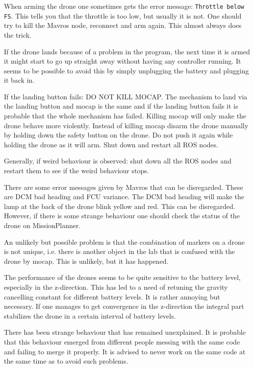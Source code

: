 \documentclass[titlepage,11pt,a4paper]{article}
\begin{document}
When arming the drone one sometimes gets the error message:
\texttt{Throttle below FS}. This tells you that the throttle is too
low, but usually it is not. One should try to kill the Mavros node,
reconnect and arm again. This almost always does the trick.

If the drone lands because of a problem in the program, the next time
it is armed it might start to go up straight away without having any
controller running. It seems to be possible to avoid this by simply
unplugging the battery and plugging it back in.

If the landing button fails: DO NOT KILL MOCAP. The mechanism to land
via the landing button and mocap is the same and if the landing button
fails it is probable that the whole mechanism has failed. Killing
mocap will only make the drone behave more violently. Instead of
killing mocap disarm the drone manually by holding down the safety
button on the drone. Do not push it again while holding the drone as
it will arm. Shut down and restart all ROS nodes.

Generally, if weird behaviour is observed: shut down all the ROS nodes
and restart them to see if the weird behaviour stops.

There are some error messages given by Mavros that can be
disregarded. These are DCM bad heading and FCU variance. The DCM bad
heading will make the lamp at the back of the drone blink yellow and
red. This can be disregarded. However, if there is some strange
behaviour one should check the status of the drone on MissionPlanner.

An unlikely but possible problem is that the combination of markers on
a drone is not unique, i.e. there is another object in the lab that is
confused with the drone by mocap. This is unlikely, but it has
happened.

The performance of the drones seems to be quite sensitive to the
battery level, especially in the z-direction. This has led to a need
of retuning the gravity cancelling constant for different battery
levels. It is rather annoying but necessary. If one manages to get
convergence in the z-direction the integral part stabilizes the drone
in a certain interval of battery levels.

There has been strange behaviour that has remained unexplained. It is
probable that this behaviour emerged from different people messing
with the same code and failing to merge it properly. It is advised to
never work on the same code at the same time as to avoid such
problems.
\end{document}
